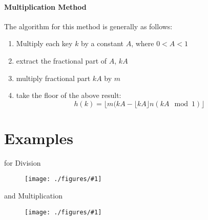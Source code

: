 \documentclass[12pt]{book}
\newcommand{\incimg}[2]{%
       \begin{figure}[h]
               \centering
               \texttt{[image: ./figures/\#1]}
       \end{figure}
}
\begin{document}
\paragraph{Multiplication Method}
The algorithm for this method is generally as follows:
\begin{enumerate}
        \item Multiply each key $k$ by a constant $A$, where $0 < A < 1$
        \item extract the fractional part of $A$, $kA$
        \item multiply fractional part $kA$ by $m$
        \item take the floor of the above result:
                \[h(k) = \lfloor m(kA - \lfloor kA \rfloor n ( k A \mod 1)\rfloor \]
\end{enumerate}

\pagebreak
\section*{Examples}
for Division
\incimg{ex1}{0.4}

and Multiplication
\incimg{ex2}{0.4}
\end{document}
